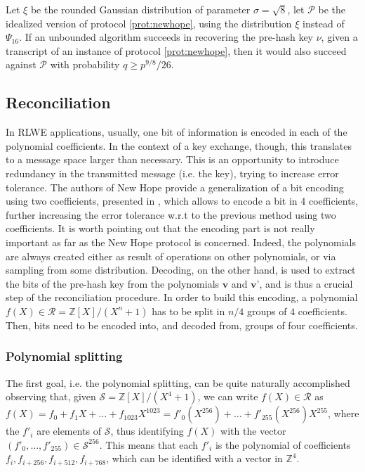 \begin{theorem}\label{thm:bin_f_bound}
Let $\xi$ be the rounded Gaussian distribution of parameter $\sigma = \sqrt{8}$, let $\mathscr{P}$ be the idealized version of protocol \ref{prot:newhope}, using the distribution $\xi$ instead of $\Psi_16$. If an unbounded algorithm succeeds in recovering the pre-hash key $\nu$, given a transcript of an instance of protocol \ref{prot:newhope}, then it would also succeed against $\mathscr{P}$ with probability $q\ge p^{9/8}/26$.
\end{theorem}

\subsection{Reconciliation}
In RLWE applications, usually, one bit of information is encoded in each of the polynomial coefficients. In the context of a key exchange, though, this translates to a message space larger than necessary. This is an opportunity to introduce redundancy in the transmitted message (i.e. the key), trying to increase error tolerance. The authors of New Hope provide a generalization of a bit encoding using two coefficients, presented in \cite{bit_encoding}, which allows to encode a bit in 4 coefficients, further increasing the error tolerance w.r.t to the previous method using two coefficients. It is worth pointing out that the encoding part is not really important as far as the New Hope protocol is concerned. Indeed, the polynomials are always created either as result of operations on other polynomials, or via sampling from some distribution. Decoding, on the other hand, is used to extract the bits of the pre-hash key from the polynomials $\textbf{v}$ and $\textbf{v'}$, and is thus a crucial step of the reconciliation procedure. In order to build this encoding, a polynomial $f(X) \in \mathscr{R} = \mathbb{Z}[X]/(X^n+1)$ has to be split in $n/4$ groups of $4$ coefficients. Then, bits need to be encoded into, and decoded from, groups of four coefficients.

\subsubsection{Polynomial splitting}
The first goal, i.e. the polynomial splitting, can be quite naturally accomplished observing that, given $\mathscr{S} = \mathbb{Z}[X]/(X^4+1)$, we can write $f(X) \in \mathscr{R}$ as $f(X) = f_0 + f_1X + \ldots + f_{1023}X^{1023} = f'_0(X^{256}) + \ldots + f'_{255}(X^{256})X^{255}$, where the $f'_i$ are elements of $\mathscr{S}$, thus identifying $f(X)$ with the vector $(f'_0,\ldots,f'_{255}) \in \mathscr{S}^{256}$. This means that each $f'_i$ is the polynomial of coefficients $f_i,f_{i+256},f_{i+512},f_{i+768}$, which can be identified with a vector in $\mathbb{Z}^4$.

